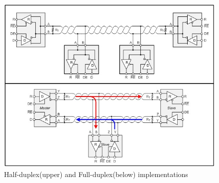     \begin{figure}[!ht]
      \begin{center}
      \includegraphics[scale=0.8]{images/rs485-fullduplex-halfduplex.jpg}
      \caption{Half-duplex(upper) and Full-duplex(below) implementations}
      \label{fig:fullHalfDuplex}
      \end{center}
    \end{figure}


